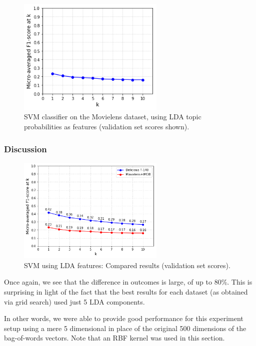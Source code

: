 \begin{figure}[H]
    \centering
    \includegraphics[width=7cm]{chapters/05_experiments/images/svm-lda-tf-idf-movielens.png}
    \caption{SVM classifier on the Movielens dataset, using LDA topic probabilities as features (validation set scores shown).}
    \label{fig:svm_lda_movielens}
\end{figure}

\subsubsection{Discussion}

\begin{figure}[H]
    \centering
    \includegraphics[width=7cm]{chapters/05_experiments/images/proposal-1-compared-svm-lda.png}
    \caption{SVM using LDA features: Compared results (validation set scores).}
    \label{fig:compared_svm_lda}
\end{figure}

Once again, we see that the difference in outcomes is large, of up to 80\%. This is surprising in light of the fact that the best results for each dataset (as obtained via grid search) used just 5 LDA components.

In other words, we were able to provide good performance for this experiment setup using a mere 5 dimensional in place of the original 500 dimensions of the bag-of-words vectors. Note that an RBF kernel was used in this section.

